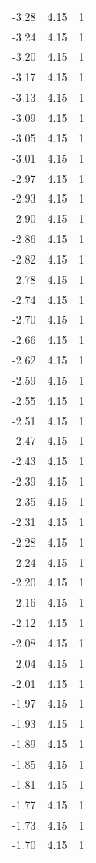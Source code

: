 \begin{longtable}{lrr}
  -3.28 & 4.15 & 1 \\
  -3.24 & 4.15 & 1 \\
  -3.20 & 4.15 & 1 \\
  -3.17 & 4.15 & 1 \\
  -3.13 & 4.15 & 1 \\
  -3.09 & 4.15 & 1 \\
  -3.05 & 4.15 & 1 \\
  -3.01 & 4.15 & 1 \\
  -2.97 & 4.15 & 1 \\
  -2.93 & 4.15 & 1 \\
  -2.90 & 4.15 & 1 \\
  -2.86 & 4.15 & 1 \\
  -2.82 & 4.15 & 1 \\
  -2.78 & 4.15 & 1 \\
  -2.74 & 4.15 & 1 \\
  -2.70 & 4.15 & 1 \\
  -2.66 & 4.15 & 1 \\
  -2.62 & 4.15 & 1 \\
  -2.59 & 4.15 & 1 \\
  -2.55 & 4.15 & 1 \\
  -2.51 & 4.15 & 1 \\
  -2.47 & 4.15 & 1 \\
  -2.43 & 4.15 & 1 \\
  -2.39 & 4.15 & 1 \\
  -2.35 & 4.15 & 1 \\
  -2.31 & 4.15 & 1 \\
  -2.28 & 4.15 & 1 \\
  -2.24 & 4.15 & 1 \\
  -2.20 & 4.15 & 1 \\
  -2.16 & 4.15 & 1 \\
  -2.12 & 4.15 & 1 \\
  -2.08 & 4.15 & 1 \\
  -2.04 & 4.15 & 1 \\
  -2.01 & 4.15 & 1 \\
  -1.97 & 4.15 & 1 \\
  -1.93 & 4.15 & 1 \\
  -1.89 & 4.15 & 1 \\
  -1.85 & 4.15 & 1 \\
  -1.81 & 4.15 & 1 \\
  -1.77 & 4.15 & 1 \\
  -1.73 & 4.15 & 1 \\
  -1.70 & 4.15 & 1 \\

\end{longtable}
